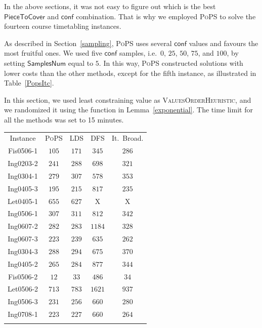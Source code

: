\documentclass{ws-ijait}
\begin{document}
In the above sections, it was not easy to figure out which
is the best $\mathsf{PieceToCover}$ and $\mathsf{conf}$
combination. That is why we employed \textsc{PoPS} to solve
the fourteen course timetabling instances.

As described in Section~\ref{sampling}, \textsc{PoPS} uses
several $\mathsf{conf}$ values and favours the most fruitful
ones. We used five $\mathsf{conf}$ samples, i.e.\ $0$, $25$,
$50$, $75$, and $100$, by setting $\mathsf{SamplesNum}$
equal to $5$. In this way, \textsc{PoPS} constructed
solutions with lower costs than the other methods, except
for the fifth instance, as illustrated in
Table~\ref{PopsItc}.

In this section, we used least constraining value as
\textsc{ValuesOrderHeuristic}, and we randomized it using
the function in Lemma~\ref{exponential}. The time limit for
all the methods was set to 15 minutes.

\begin{table}
  {\begin{tabular}{ccccc}
    \toprule
              Instance & \textsc{PoPS} & LDS & DFS & It.\ Broad. \\
    \colrule
    \textsf{Fis0506-1} & $\mathit{105}$ & $171$ &  $345$ & $286$ \\
    \textsf{Ing0203-2} & $\mathit{241}$ & $288$ &  $698$ & $321$ \\
    \textsf{Ing0304-1} & $\mathit{279}$ & $307$ &  $578$ & $353$ \\
    \textsf{Ing0405-3} & $\mathit{195}$ & $215$ &  $817$ & $235$ \\
    \textsf{Let0405-1} & $655$ & $\mathit{627}$ &    X   &   X   \\
    \textsf{Ing0506-1} & $\mathit{307}$ & $311$ &  $812$ & $342$ \\
    \textsf{Ing0607-2} & $\mathit{282}$ & $283$ & $1184$ & $328$ \\
    \textsf{Ing0607-3} & $\mathit{223}$ & $239$ &  $635$ & $262$ \\
    \textsf{Ing0304-3} & $\mathit{288}$ & $294$ &  $675$ & $370$ \\
    \textsf{Ing0405-2} & $\mathit{265}$ & $284$ &  $877$ & $344$ \\
    \textsf{Fis0506-2} &  $\mathit{12}$ &  $33$ &  $486$ &  $34$ \\
    \textsf{Let0506-2} & $\mathit{713}$ & $783$ & $1621$ & $937$ \\
    \textsf{Ing0506-3} & $\mathit{231}$ & $256$ &  $660$ & $280$ \\
    \textsf{Ing0708-1} & $\mathit{223}$ & $227$ &  $660$ & $264$ \\
    \botrule
  \end{tabular}}
\end{table}
\end{document}
